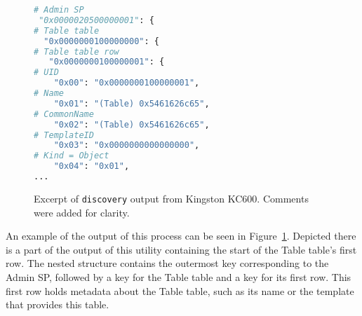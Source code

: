 \begin{figure}
    \centering
\begin{lstlisting}[language=Python]
# Admin SP
 "0x0000020500000001": {
# Table table
  "0x0000000100000000": {
# Table table row
   "0x0000000100000001": {
# UID
    "0x00": "0x0000000100000001",
# Name
    "0x01": "(Table) 0x5461626c65",
# CommonName
    "0x02": "(Table) 0x5461626c65",
# TemplateID
    "0x03": "0x0000000000000000",
# Kind = Object
    "0x04": "0x01",
...
\end{lstlisting}
    \caption{Excerpt of \texttt{discovery} output from Kingston KC600. Comments were added for clarity.}
    \label{fig:discovery_example}
\end{figure}


An example of the output of this process can be seen in Figure~\ref{fig:discovery_example}. Depicted there is a part of the output of this utility containing the start of the Table table's first row. The nested structure contains the outermost key corresponding to the Admin SP, followed by a key for the Table table and a key for its first row. 
This first row holds metadata about the Table table, such as its name or the template that provides this table.


















